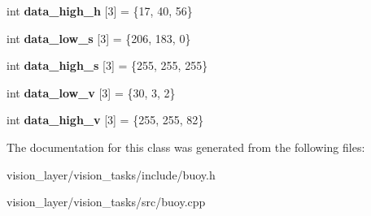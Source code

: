 \begin{DoxyCompactItemize}
int {\bfseries data\+\_\+high\+\_\+h} \mbox{[}3\mbox{]} = \{17, 40, 56\}
\item 
\mbox{\label{classBuoy_a46d4f0a04d9eec9f40086ced3e674679}} 
int {\bfseries data\+\_\+low\+\_\+s} \mbox{[}3\mbox{]} = \{206, 183, 0\}
\item 
\mbox{\label{classBuoy_a488a83dc51aadd7ffc5f02e08f27728e}} 
int {\bfseries data\+\_\+high\+\_\+s} \mbox{[}3\mbox{]} = \{255, 255, 255\}
\item 
\mbox{\label{classBuoy_aea30660a61beb8dbff66ae13d8851bf9}} 
int {\bfseries data\+\_\+low\+\_\+v} \mbox{[}3\mbox{]} = \{30, 3, 2\}
\item 
\mbox{\label{classBuoy_a8ec5f9ef0ebb0ddf8497d89b99f80b1c}} 
int {\bfseries data\+\_\+high\+\_\+v} \mbox{[}3\mbox{]} = \{255, 255, 82\}
\end{DoxyCompactItemize}


The documentation for this class was generated from the following files\+:\begin{DoxyCompactItemize}
\item 
vision\+\_\+layer/vision\+\_\+tasks/include/buoy.\+h\item 
vision\+\_\+layer/vision\+\_\+tasks/src/buoy.\+cpp\end{DoxyCompactItemize}
